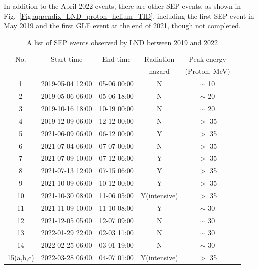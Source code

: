 In addition to the April 2022 events, there are other \ac{SEP} events, as shown in Fig.~\ref{Fig:appendix_LND_proton_helium_TID}, including the first \ac{SEP} event in May 2019 and the first \ac{GLE} event at the end of 2021, though not completed.

\begin{table}[!tbhp]
    \centering
    \caption[\ac{LND} \ac{SEP} events lists]{A list of \ac{SEP} events observed by \ac{LND} between 2019 and 2022}
\begin{tabular}{cccccc}
    \hline
    No.     &  Start time    & End time      & Radiation  & Peak energy \\
            &                &               & hazard      & (Proton, MeV)\\
    \hline
    1       &   2019-05-04 12:00 & 05-06 00:00               & N  & $\sim$ 10\\
    2       &   2019-05-06 06:00 & 05-06 18:00              & N  & $\sim$ 20 \\
    3       &   2019-10-16 18:00 & 10-19 00:00             & N  & $\sim$ 20 \\
    4       &   2019-12-09 06:00 & 12-12 00:00             & N  & $>$ 35 \\    
    5       &   2021-06-09 06:00 & 06-12 00:00             & Y  & $>$ 35 \\
    6       &   2021-07-04 06:00 & 07-07 00:00             & N  & $>$ 35 \\
    7       &   2021-07-09 10:00 & 07-12 06:00             & Y  & $>$ 35 \\
    8       &   2021-07-13 12:00 & 07-15 06:00             & Y  & $>$ 35 \\
    9       &   2021-10-09 06:00 & 10-12 00:00             & Y  & $>$ 35 \\
    10      &   2021-10-30 08:00 & 11-06 05:00             & Y(intensive)  & $>$ 35\\
    11      &   2021-11-09 10:00 & 11-10 08:00             & Y  & $\sim$ 30 \\
    12      &   2021-12-05 05:00 & 12-07 09:00             & N  & $\sim$ 30 \\
    13      &   2022-01-29 22:00 & 02-03 11:00             & N  & $\sim$ 30 \\
    14      &   2022-02-25 06:00 & 03-01 19:00             & N  & $\sim$ 30 \\
    15(a,b,c) & 2022-03-28 06:00 & 04-07 01:00             & Y(intensive)  & $>$ 35 \\

\end{tabular}
\end{table}
